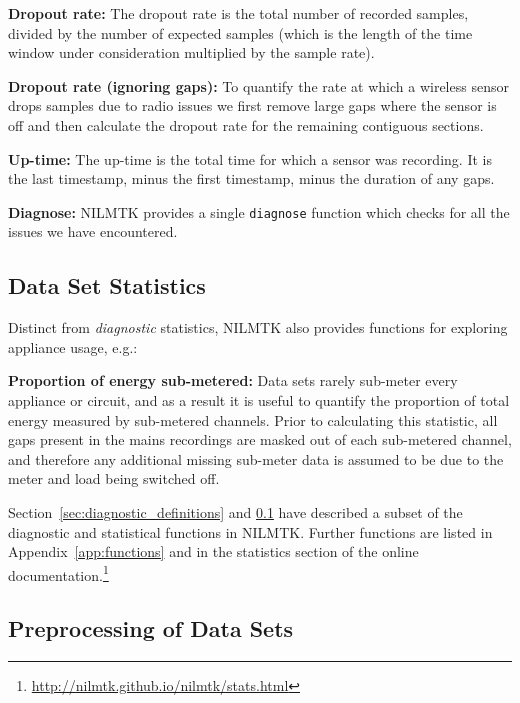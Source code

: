 \documentclass{sig-alternate}
\newcommand{\bluecolor}[1]{\textcolor{blue}{#1}}
\newcommand{\secref}[1]{Section~\ref{#1}}
\begin{document}
\textbf{Dropout rate:} The
dropout rate is the total number of recorded samples, divided by the
number of expected samples (which is the length of the time window
under consideration multiplied by the sample rate).

\textbf{Dropout rate (ignoring gaps):} To quantify the rate
at which a wireless sensor drops samples due to radio issues we
 first remove large gaps where the sensor is off and then
 calculate the dropout rate for the remaining contiguous sections.

\textbf{Up-time:}  The up-time is the total time for which a sensor
was recording.  It is the last timestamp, minus the first timestamp,
minus the duration of any gaps.

\textbf{Diagnose:} NILMTK provides a single \texttt{diagnose}
function which checks for all the issues we have encountered.

\subsection{Data Set Statistics}
\label{sec:stats_definitions}

\noindent
Distinct from \emph{diagnostic} statistics, NILMTK also provides
functions for exploring appliance usage, e.g.:

\textbf{Proportion of energy sub-metered:} Data sets rarely sub-meter
every appliance or circuit, and as a result it is useful to quantify the proportion of
total energy measured by sub-metered channels. 
Prior to calculating this
statistic, all gaps present in the mains recordings are masked out of
each sub-metered channel, and therefore any additional missing sub-meter data is assumed to
be due to the meter and load being switched off.

\secref{sec:diagnostic_definitions} and \ref{sec:stats_definitions} have described a subset of the diagnostic and
statistical functions in NILMTK.  Further functions are listed
in Appendix~\ref{app:functions} and in the statistics section of the
online documentation.\footnote{
  \url{http://nilmtk.github.io/nilmtk/stats.html}}

\subsection{Preprocessing of Data Sets}
\label{sec:preprocessing}
\end{document}
